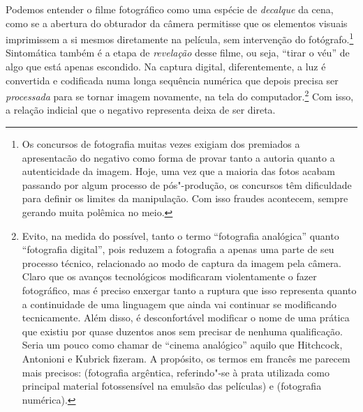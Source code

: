Podemos entender o filme fotográfico como uma espécie de \emph{decalque}
da cena, como se a abertura do obturador da câmera permitisse que os
elementos visuais imprimissem a si mesmos diretamente na película, sem
intervenção do fotógrafo.\footnote{Os concursos de fotografia muitas
  vezes exigiam dos premiados a apresentacão do negativo como forma de
  provar tanto a autoria quanto a autenticidade da imagem. Hoje, uma vez
  que a maioria das fotos acabam passando por algum processo de
  pós"-produção, os concursos têm dificuldade para definir os limites da
  manipulação. Com isso fraudes acontecem, sempre gerando muita polêmica
  no meio.} Sintomática também é a etapa de \emph{revelação} desse
filme, ou seja, ``tirar o véu'' de algo que está apenas escondido. Na
captura digital, diferentemente, a luz é convertida e codificada numa
longa sequência numérica que depois precisa ser \emph{processada} para
se tornar imagem novamente, na tela do computador.\footnote{Evito, na
  medida do possível, tanto o termo ``fotografia analógica'' quanto
  ``fotografia digital'', pois reduzem a fotografia a apenas uma parte
  de seu processo técnico, relacionado ao modo de captura da imagem pela
  câmera. Claro que os avanços tecnológicos modificaram violentamente o
  fazer fotográfico, mas é preciso enxergar tanto a ruptura que isso
  representa quanto a continuidade de uma linguagem que ainda vai
  continuar se modificando tecnicamente. Além disso, é desconfortável
  modificar {} o nome de uma prática que existiu por
  quase duzentos anos sem precisar de nenhuma qualificação. Seria um
  pouco como chamar de ``cinema analógico'' aquilo que Hitchcock,
  Antonioni e Kubrick fizeram. A propósito, os termos em francês me
  parecem mais precisos: {} (fotografia
  argêntica, referindo"-se à prata utilizada como principal material
  fotossensível na emulsão das películas) e {} (fotografia numérica).} Com isso, a relação indicial que o
negativo representa deixa de ser direta.

